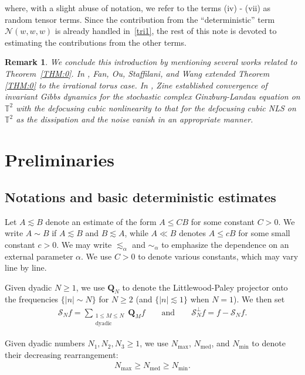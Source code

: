 \documentclass[%
11pt,  reqno]{amsart}
\newtheorem{remark}[theorem]{Remark}
\DeclareMathOperator{\med}{med}
\newcommand{\1}{\hspace{0.2mm}\text{I}\hspace{0.2mm}}
\newcommand{\noi}{\noindent}
\newcommand{\T}{\mathbb{T}}
\newcommand{\Q}{\mathbf{Q}}
\newcommand{\Sb}{\pmb{\mathcal{S}}}
\newcommand{\al}{\alpha}
\newcommand{\les}{\lesssim}
\newcommand{\NN}{\mathcal{N}}
\numberwithin{equation}{section}
\numberwithin{theorem}{section}
\begin{document}
\smallskip

\noi
where, with a slight abuse of notation, 
we refer to the terms (iv) - (vii) 
as random tensor terms.
Since the contribution from 
the
``deterministic'' term
$\NN(w, w, w)$
is already handled in~\eqref{tri1}, 
the rest of this note is devoted
to estimating the contributions
from the other terms.


\begin{remark}\rm
We conclude this introduction
by mentioning several works related
to Theorem~\ref{THM:0}.
In \cite{FOSW}, 
Fan, Ou, Staffilani, and Wang
extended 
Theorem \ref{THM:0}
 to the irrational torus case.
In \cite{Zine}, 
Zine established
convergence of invariant Gibbs dynamics
for the stochastic  complex 
Ginzburg-Landau equation on $\T^2$
with the defocusing cubic nonlinearity 
to that for the defocusing cubic NLS on $\T^2$
as the dissipation and the noise vanish
in an appropriate manner.
\end{remark}





\section{Preliminaries}
\label{SEC:2}


\subsection{Notations and basic deterministic estimates}

Let $A\les B$ denote an estimate of the form $A\leq CB$ for some constant $C>0$. We write $A\sim B$ if $A\les B$ and $B\les A$, while $A\ll B$ denotes $A\leq c B$ for some small constant $c> 0$. 
We may write  $\les_{\al}$ and $\sim_{\al}$ to 
emphasize the dependence on an external parameter $\al$.
We use $C>0$ to denote various constants, which may vary line by line.



Given dyadic $N\ge 1$, 
we use $\Q_N$ to denote the 
Littlewood-Paley projector onto the frequencies
$\{|n| \sim N\}$ for $N \ge 2$ (and $\{|n| \les 1\}$ when $N = 1$).
We then set
\begin{align}
\Sb_N f= \sum_{\substack{1 \le M \le N\\\text{dyadic}}}\Q_Mf
\qquad \text{and}
\qquad 
\Sb_N^\perp f = f - \Sb_N f.
\label{LP2}
\end{align}


\noi
Given dyadic numbers $N_1, N_2, N_3 \ge 1$, 
we use $N_{\max}$, $N_{\med}$, and $N_{\min}$
to denote their decreasing rearrangement:
\begin{align}
N_{\max} \ge N_{\med} \ge N_{\min}.
\label{ord1}
\end{align}
\end{document}
